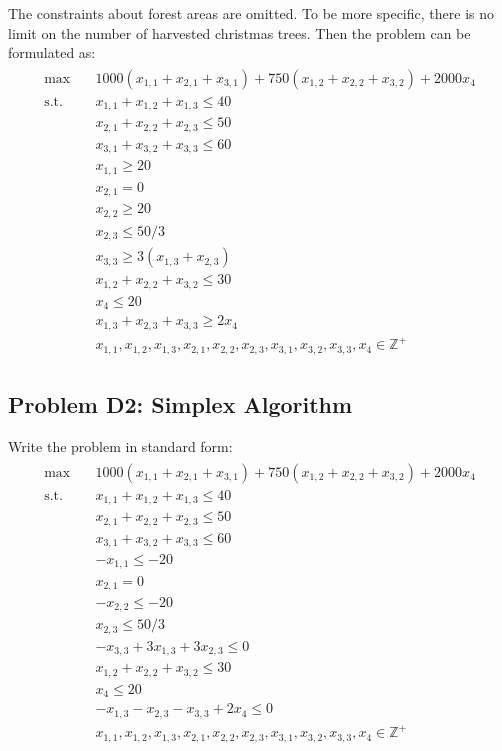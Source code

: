 \documentclass[fleqn,10pt]{wlscirep}
\begin{document}
The constraints about forest areas are omitted. To be more specific, there is no limit on the number of harvested christmas trees. Then the problem can be formulated as:
\begin{align} \begin{split}
    \max \quad & 1000 (x_{1,1} + x_{2,1} + x_{3,1}) + 750 (x_{1,2} + x_{2,2} + x_{3,2}) + 2000 x_{4} \\
    \text{s.t.} \quad 
    & x_{1,1} + x_{1,2} + x_{1,3} \leq 40 \\
    & x_{2,1} + x_{2,2} + x_{2,3} \leq 50 \\
    & x_{3,1} + x_{3,2} + x_{3,3} \leq 60 \\
    & x_{1,1} \geq 20 \\
    & x_{2,1} = 0 \\
    & x_{2,2} \geq 20 \\
    & x_{2,3} \leq 50 / 3 \\
    & x_{3,3} \geq 3 (x_{1,3} + x_{2,3}) \\
    & x_{1,2} + x_{2,2} + x_{3,2} \leq 30 \\
    & x_{4} \leq 20 \\
    & x_{1,3} + x_{2,3} + x_{3,3} \geq 2 x_{4} \\
    & x_{1,1}, x_{1,2}, x_{1,3}, x_{2,1}, x_{2,2}, x_{2,3}, x_{3,1}, x_{3,2}, x_{3,3}, x_{4} \in \mathbb{Z}^{+}
\end{split} \end{align} 

\subsection{Problem D2: Simplex Algorithm}

Write the problem in standard form:
\begin{align} \begin{split}
    \max \quad & 1000 (x_{1,1} + x_{2,1} + x_{3,1}) + 750 (x_{1,2} + x_{2,2} + x_{3,2}) + 2000 x_{4} \\
    \text{s.t.} \quad 
    & x_{1,1} + x_{1,2} + x_{1,3} \leq 40 \\
    & x_{2,1} + x_{2,2} + x_{2,3} \leq 50 \\
    & x_{3,1} + x_{3,2} + x_{3,3} \leq 60 \\
    & - x_{1,1} \leq - 20 \\
    & x_{2,1} = 0 \\
    & - x_{2,2} \leq - 20 \\
    & x_{2,3} \leq 50 / 3 \\
    & - x_{3,3} + 3 x_{1,3} + 3 x_{2,3} \leq 0 \\
    & x_{1,2} + x_{2,2} + x_{3,2} \leq 30 \\
    & x_{4} \leq 20 \\
    & - x_{1,3} - x_{2,3} - x_{3,3} + 2 x_{4} \leq 0 \\
    & x_{1,1}, x_{1,2}, x_{1,3}, x_{2,1}, x_{2,2}, x_{2,3}, x_{3,1}, x_{3,2}, x_{3,3}, x_{4} \in \mathbb{Z}^{+}
\end{split} \end{align} 
\end{document}
